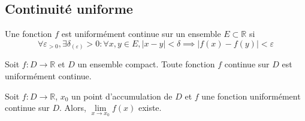 	\subsection{Continuité uniforme}
		\begin{mydef}
			Une fonction $f$ est uniformément continue sur un ensemble $E\subset\mathbb{R}$ si \[\forall\varepsilon_{>0},\exists\delta_{(\varepsilon)}>0 : \forall x,y\in E, |x-y|<\delta \implies |f(x)-f(y)|<\varepsilon\]
		\end{mydef}
		\begin{mythm}
			Soit $f:D\longrightarrow\mathbb{R}$ et $D$ un ensemble compact. Toute fonction $f$ continue sur $D$ est uniformément continue.
		\end{mythm}
		\begin{mythm}
			Soit $f:D\longrightarrow\mathbb{R}$, $x_0$ un point d'accumulation de $D$ et $f$ une fonction uniformément continue sur $D$. Alors, $\lim\limits_{x\to x_0}f(x)$ existe.
		\end{mythm}

